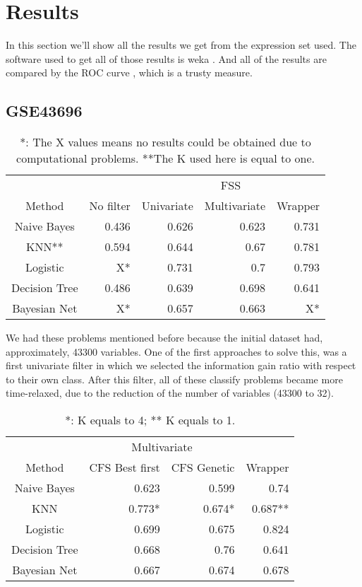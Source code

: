 \documentclass[conference,a4paper]{IEEEtran}
\begin{document}
\section{Results}


In this section we'll show all the results we get from the expression set used. The software used to get all of those results is weka \cite{weka}. And all of the results are compared by the ROC curve \cite{ROC}, which is a trusty measure.

\subsection{GSE43696}

\begin{table}[h]
	\caption{*: The X values means no results could be obtained due to computational problems. **The K used here is equal to one.}
	\centering
	\begin{tabular}{c r r r r}
		\hline
		& & \multicolumn{3}{|c}{FSS} \\
		Method & No filter & \multicolumn{1}{|c}{Univariate} & Multivariate & Wrapper\\ [0.2ex]
		\hline
		Naive Bayes & 0.436 & 0.626 & 0.623 & 0.731 \\
		KNN** & 0.594 & 0.644 & 0.67 & 0.781 \\
		Logistic &  X* & 0.731 & 0.7 & 0.793\\
		Decision Tree & 0.486 & 0.639 & 0.698 & 0.641\\
		Bayesian Net & X* & 0.657 & 0.663 & X* \\ [1ex]
		\hline
	\end{tabular}
	
\label{table:basicsResults}
\end{table}

We had these problems mentioned before because the initial dataset had, approximately, 43300 variables. One of the first approaches to solve this, was a first univariate filter in which we selected the information gain ratio with respect to their own class. After this filter, all of these classify problems became more time-relaxed, due to the reduction of the number of variables (43300 to 32).

\begin{table}[h]
	\caption{*: K equals to 4; ** K equals to 1.}
	\centering
	\begin{tabular}{c r r r}
		\hline\hline
		& \multicolumn{2}{c}{Multivariate} & \\
		Method & CFS Best first & CFS Genetic & Wrapper\\ [0.2ex]
		\hline
		Naive Bayes & 0.623 & 0.599 & 0.74 \\
		KNN & 0.773* & 0.674* & 0.687** \\
		Logistic & 0.699 & 0.675 & 0.824 \\
		Decision Tree & 0.668 & 0.76 & 0.641 \\
		Bayesian Net & 0.667 & 0.674 & 0.678 \\ [1ex]
		\hline
	\end{tabular}
	\label{table:filteredResults}
\end{table}
\end{document}
